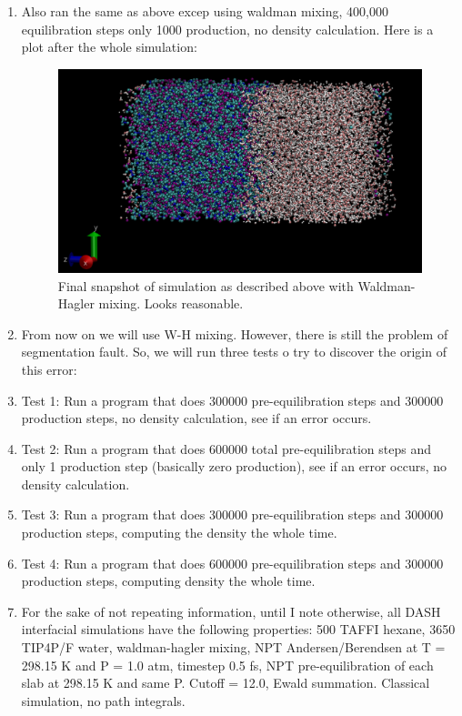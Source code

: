 \documentclass[12pt,reqno]{amsart}
\numberwithin{equation}{section}
\begin{document}
\begin{enumerate}
\item Also ran the same as above excep using waldman mixing, 400,000 equilibration steps only 1000 production, no density calculation.  Here is a plot after the whole simulation:

\begin{figure}[H]
\centering
\includegraphics[scale=0.4]{waldman_pic}
\caption{Final snapshot of simulation as described above with Waldman-Hagler mixing.  Looks reasonable.}
\end{figure}

\item From now on we will use W-H mixing.  However, there is still the problem of segmentation fault.  So, we will run three tests o try to discover the origin of this error:
\item Test 1: Run a program that does 300000 pre-equilibration steps and 300000 production steps, no density calculation, see if an error occurs.
\item Test 2: Run a program that does 600000 total pre-equilibration steps and only 1 production step (basically zero production), see if an error occurs, no density calculation.
\item Test 3: Run a program that does 300000 pre-equilibration steps and 300000 production steps, computing the density the whole time. 
\item Test 4: Run a program that does 600000 pre-equilibration steps and 300000 production steps, computing density the whole time.   

\item For the sake of not repeating information, until I note otherwise, all DASH interfacial simulations have the following properties: 500 TAFFI hexane, 3650 TIP4P/F water, waldman-hagler mixing, NPT Andersen/Berendsen at T = 298.15 K and P = 1.0 atm, timestep 0.5 fs, NPT pre-equilibration of each slab at 298.15 K and same P.  Cutoff = 12.0, Ewald summation.  Classical simulation, no path integrals. 


\end{enumerate}
\end{document}
